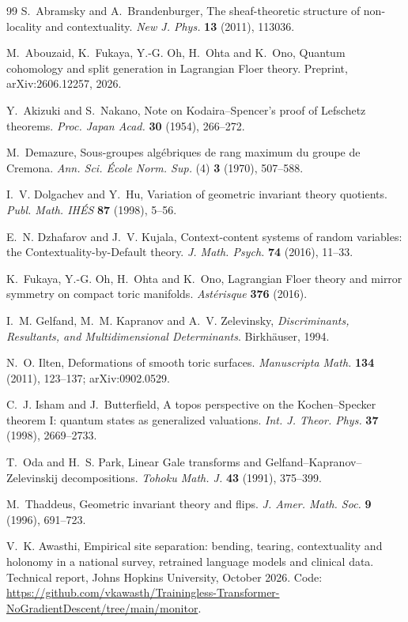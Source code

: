 \documentclass[11pt]{article}
\theoremstyle{definition}
\theoremstyle{remark}
\begin{document}
\begin{thebibliography}{99}
S.~Abramsky and A.~Brandenburger, The sheaf-theoretic structure of non-locality and contextuality. \emph{New J. Phys.}
\textbf{13} (2011), 113036.

M.~Abouzaid, K.~Fukaya, Y.-G. Oh, H.~Ohta and K.~Ono, Quantum cohomology and split generation in Lagrangian Floer theory.
Preprint, arXiv:2606.12257, 2026.

Y.~Akizuki and S.~Nakano, Note on Kodaira--Spencer's proof of Lefschetz theorems. \emph{Proc. Japan Acad.} \textbf{30} (1954),
266--272.

M.~Demazure, Sous-groupes algébriques de rang maximum du groupe de Cremona. \emph{Ann. Sci. École Norm. Sup.} (4) \textbf{3} (1970),
507--588.

I.~V. Dolgachev and Y.~Hu, Variation of geometric invariant theory quotients. \emph{Publ. Math. IHÉS} \textbf{87} (1998), 5--56.

E.~N. Dzhafarov and J.~V. Kujala, Context-content systems of random variables: the Contextuality-by-Default theory.
\emph{J. Math. Psych.} \textbf{74} (2016), 11--33.

K.~Fukaya, Y.-G. Oh, H.~Ohta and K.~Ono, Lagrangian Floer theory and mirror symmetry on compact toric manifolds. \emph{Astérisque}
\textbf{376} (2016).

I.~M. Gelfand, M.~M. Kapranov and A.~V. Zelevinsky, \emph{Discriminants, Resultants, and Multidimensional Determinants}.
Birkhäuser, 1994.

N.~O. Ilten, Deformations of smooth toric surfaces. \emph{Manuscripta Math.} \textbf{134} (2011), 123--137; arXiv:0902.0529.

C.~J. Isham and J.~Butterfield, A topos perspective on the Kochen--Specker theorem {I}: quantum states as generalized valuations.
\emph{Int. J. Theor. Phys.} \textbf{37} (1998), 2669--2733.

T.~Oda and H.~S. Park, Linear Gale transforms and Gelfand--Kapranov--Zelevinskij decompositions. \emph{Tohoku Math. J.} \textbf{43}
(1991), 375--399.

M.~Thaddeus, Geometric invariant theory and flips. \emph{J. Amer. Math. Soc.} \textbf{9} (1996), 691--723.

V.~K. Awasthi, Empirical site separation: bending, tearing, contextuality and holonomy in a national survey, retrained language models and
clinical data. Technical report, Johns Hopkins University, October 2026. Code: \url{https://github.com/vkawasth/Trainingless-Transformer-NoGradientDescent/tree/main/monitor}.

\end{thebibliography}
\end{document}
